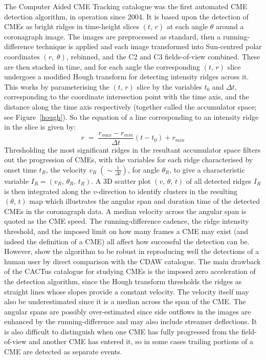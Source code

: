 \documentclass[namedreferences]{SolarPhysics}
\begin{document}
\begin{article}
The Computer Aided CME Tracking catalogue \citep[CACTus\footnote{http://sidc.oma.be/cactus/};][]{2004A&A...425.1097R} was the first automated CME detection algorithm, in operation since 2004. It is based upon the detection of CMEs as bright ridges in time-height slices $(t,\, r)$ at each angle $\theta$ around a coronagraph image. The images are preprocessed as standard, then a running-difference technique is applied and each image transformed into Sun-centred polar coordinates $(r,\; \theta)$, rebinned, and the C2 and C3 fields-of-view combined. These are then stacked in time, and for each angle the corresponding $(t,\,r)$ slice undergoes a modified Hough transform for detecting intensity ridges across it. This works by parameterising the $(t,\, r)$ slice by the variables $t_0$ and $\Delta t$, corresponding to the coordinate intersection point with the time axis, and the distance along the time axis respectively (together called the accumulator space; see Figure~\ref{hough}). So the equation of a line corresponding to an intensity ridge in the slice is given by:
\begin{equation}
r \; = \; \frac{r_{max}-r_{min}}{\Delta t} (t-t_0) + r_{min}
\end{equation}
Thresholding the most significant ridges in the resultant accumulator space filters out the progression of CMEs, with the variables for each ridge characterised by onset time $t_R$, the velocity $v_R \; \left( \sim \frac{1}{\Delta t} \right)$, for angle $\theta_R$, to give a characteristic variable $I_R=\left(v_R,\, \theta_R,\, t_R \right)$. A 3D scatter plot $(v,\, \theta,\, t)$ of all detected ridges $I_R$ is then integrated along the $v$-direction to identify clusters in the resulting $(\theta,\, t)$ map which illustrates the angular span and duration time of the detected CMEs in the coronagraph data. A median velocity across the angular span is quoted as the CME speed.
\newline
\indent The running-difference cadence, the ridge intensity threshold, and the imposed limit on how many frames a CME may exist (and indeed the definition of a CME) all affect how successful the detection can be. However, \citet{2004A&A...425.1097R} show the algorithm to be robust in reproducing well the detections of a human user by direct comparison with the CDAW catalogue. The main drawback of the CACTus catalogue for studying CMEs is the imposed zero acceleration of the detection algorithm, since the Hough transform thresholds the ridges as straight lines whose slopes provide a constant velocity. The velocity itself may also be underestimated since it is a median across the span of the CME. The angular spans are possibly over-estimated since side outflows in the images are enhanced by the running-difference and may also include streamer deflections. It is also difficult to distinguish when one CME has fully progressed from the field-of-view and another CME has entered it, so in some cases trailing portions of a CME are detected as separate events.


\end{article}
\end{document}
